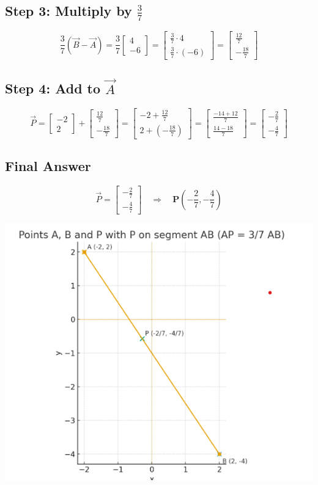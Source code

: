 \documentclass[journal]{IEEEtran}
\begin{document}
\subsection*{Step 3: Multiply by $\frac{3}{7}$}
\[
\frac{3}{7}(\vec{B}-\vec{A}) =
\frac{3}{7} \begin{bmatrix}4 \\ -6\end{bmatrix} =
\begin{bmatrix}
\frac{3}{7} \cdot 4 \\
\frac{3}{7} \cdot (-6)
\end{bmatrix} =
\begin{bmatrix}
\frac{12}{7} \\
-\frac{18}{7}
\end{bmatrix}
\]

\subsection*{Step 4: Add to $\vec{A}$}
\[
\vec{P} = 
\begin{bmatrix}-2 \\ 2\end{bmatrix} +
\begin{bmatrix}\frac{12}{7} \\ -\frac{18}{7}\end{bmatrix} =
\begin{bmatrix}
-2 + \frac{12}{7} \\
2 + \left(-\frac{18}{7}\right)
\end{bmatrix} =
\begin{bmatrix}
\frac{-14 + 12}{7} \\
\frac{14 - 18}{7}
\end{bmatrix} =
\begin{bmatrix}
-\frac{2}{7} \\
-\frac{4}{7}
\end{bmatrix}
\]

\subsection*{Final Answer}
\[
\vec{P} = 
\begin{bmatrix}-\frac{2}{7} \\ -\frac{4}{7}\end{bmatrix}
\quad\Rightarrow\quad
\textbf{P}\left(-\frac{2}{7}, -\frac{4}{7}\right)
\]


\begin{center}
    \includegraphics[width=0.6\columnwidth]{figs/plot1.png}
\end{center}
\end{document}
